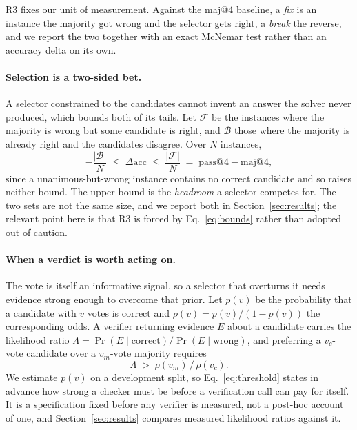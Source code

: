 R3 fixes our unit of measurement. Against the maj@4 baseline, a \emph{fix} is
an instance the majority got wrong and the selector gets right, a \emph{break}
the reverse, and we report the two together with an exact McNemar test rather
than an accuracy delta on its own.

\paragraph{Selection is a two-sided bet.}
A selector constrained to the candidates cannot invent an answer the solver
never produced, which bounds both of its tails. Let $\mathcal{F}$ be the
instances where the majority is wrong but some candidate is right, and
$\mathcal{B}$ those where the majority is already right and the candidates
disagree. Over $N$ instances,
\begin{equation}
  -\frac{|\mathcal{B}|}{N}
  \;\le\; \Delta\mathrm{acc}
  \;\le\; \frac{|\mathcal{F}|}{N}
  \;=\; \mathrm{pass@}4 - \mathrm{maj@}4 ,
  \label{eq:bounds}
\end{equation}
since a unanimous-but-wrong instance contains no correct candidate and so
raises neither bound. The upper bound is the \emph{headroom} a selector
competes for. The two sets are not the same size, and we report both in
Section~\ref{sec:results}; the relevant point here is that R3 is forced by
Eq.~\eqref{eq:bounds} rather than adopted out of caution.

\paragraph{When a verdict is worth acting on.}
The vote is itself an informative signal, so a selector that overturns it needs
evidence strong enough to overcome that prior. Let $p(v)$ be the probability
that a candidate with $v$ votes is correct and
$\rho(v) = p(v)/(1 - p(v))$ the corresponding odds. A verifier returning
evidence $E$ about a candidate carries the likelihood ratio
$\Lambda = \Pr(E \mid \text{correct}) / \Pr(E \mid \text{wrong})$, and
preferring a $v_c$-vote candidate over a $v_m$-vote majority requires
\begin{equation}
  \Lambda \;>\; \rho(v_m) \,/\, \rho(v_c) .
  \label{eq:threshold}
\end{equation}
We estimate $p(v)$ on a development split, so Eq.~\eqref{eq:threshold} states
in advance how strong a checker must be before a verification call can pay for
itself. It is a specification fixed before any verifier is measured, not a
post-hoc account of one, and Section~\ref{sec:results} compares measured
likelihood ratios against it.


